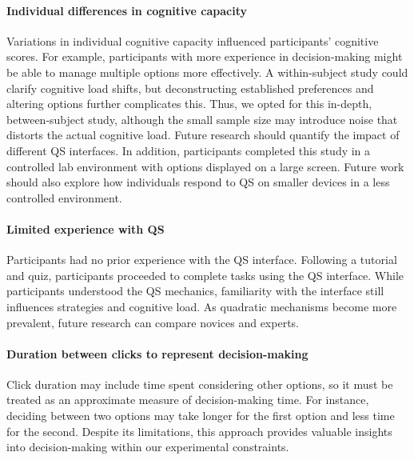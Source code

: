 \paragraph{Individual differences in cognitive capacity}
Variations in individual cognitive capacity influenced participants' cognitive scores. For example, participants with more experience in decision-making might be able to manage multiple options more effectively. A within-subject study could clarify cognitive load shifts, but deconstructing established preferences and altering options further complicates this. Thus, we opted for this in-depth, between-subject study, although the small sample size may introduce noise that distorts the actual cognitive load. Future research should quantify the impact of different QS interfaces. In addition, participants completed this study in a controlled lab environment with options displayed on a large screen. Future work should also explore how individuals respond to QS on smaller devices in a less controlled environment.

\paragraph{Limited experience with QS}
Participants had no prior experience with the QS interface. Following a tutorial and quiz, participants proceeded to complete tasks using the QS interface. While participants understood the QS mechanics, familiarity with the interface still influences strategies and cognitive load. As quadratic mechanisms become more prevalent, future research can compare novices and experts.

\paragraph{Duration between clicks to represent decision-making}
Click duration may include time spent considering other options, so it must be treated as an approximate measure of decision-making time. For instance, deciding between two options may take longer for the first option and less time for the second. Despite its limitations, this approach provides valuable insights into decision-making within our experimental constraints.



